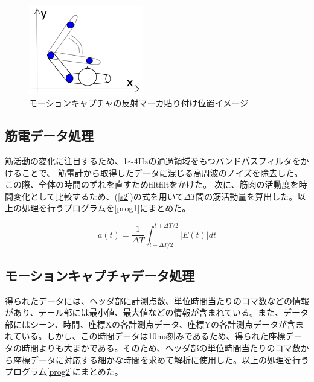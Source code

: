 \documentclass{jsarticle}
\begin{document}
\begin{figure}[htb]
\begin{center}
\includegraphics[width=5cm]{karada.png}
\caption{モーションキャプチャの反射マーカ貼り付け位置イメージ}
\label{karada2}
\end{center}
\end{figure}


\subsection{筋電データ処理}
筋活動の変化に注目するため、1$\sim$4Hzの通過領域をもつバンドパスフィルタをかけることで、
筋電計から取得したデータに混じる高周波のノイズを除去した。
この際、全体の時間のずれを直すためfiltfiltをかけた。
次に、筋肉の活動度を時間変化として比較するため、(\ref{s2})の式を用いて$\Delta T$間の筋活動量を算出した。以上の処理を行うプログラムを\ref{prog1}にまとめた。



\begin{equation}
a(t)=\frac{1}{\Delta T}\int_{t-\Delta T/2}^{t+\Delta T/2}|E(t)|dt 
\label{s2}
\end{equation}


\subsection{モーションキャプチャデータ処理}
得られたデータには、ヘッダ部に計測点数、単位時間当たりのコマ数などの情報があり、テール部には最小値、最大値などの情報が含まれている。また、データ部にはシーン、時間、座標Xの各計測点データ、座標Yの各計測点データが含まれている。しかし、この時間データは10ms刻みであるため、得られた座標データの時間よりも大まかである。そのため、ヘッダ部の単位時間当たりのコマ数から座標データに対応する細かな時間を求めて解析に使用した。以上の処理を行うプログラム\ref{prog2}にまとめた。
\end{document}
